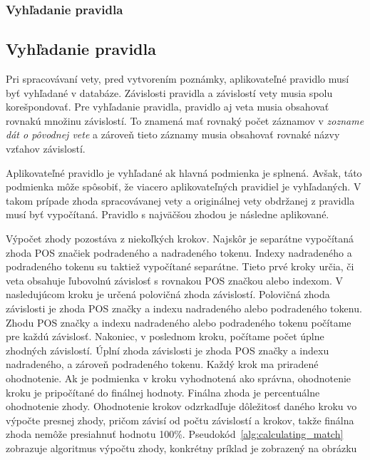 %
%
{
	\subsubsection{Vyhľadanie pravidla}
}
{
	\subsection{Vyhľadanie pravidla}
}

\label{subsubsection:rule_lookup}
Pri spracovávaní vety, pred vytvorením poznámky, aplikovateľné pravidlo musí byť vyhľadané v databáze. Závislosti pravidla a závislostí vety musia spolu korešpondovať. Pre vyhľadanie pravidla, pravidlo aj veta musia obsahovať rovnakú množinu závislostí. To znamená mať rovnaký počet záznamov v \textit{zozname dát o pôvodnej vete} a zároveň tieto záznamy musia obsahovať rovnaké názvy vzťahov závislostí.

Aplikovateľné pravidlo je vyhľadané ak hlavná podmienka je splnená. Avšak, táto podmienka môže spôsobiť, že viacero aplikovateľných pravidiel je vyhľadaných. V takom prípade zhoda spracovávanej vety a originálnej vety obdržanej z pravidla musí byť vypočítaná. Pravidlo s najväčšou zhodou je následne aplikované.

Výpočet zhody pozostáva z niekoľkých krokov. Najskôr je separátne vypočítaná zhoda POS značiek podradeného a nadradeného tokenu. Indexy nadradeného a podradeného tokenu su taktiež vypočítané separátne. Tieto prvé kroky určia, či veta obsahuje ľubovolnú závislosť s rovnakou POS značkou alebo indexom. V nasledujúcom kroku je určená polovičná zhoda závislostí. Polovičná zhoda závislosti je zhoda POS značky a indexu nadradeného alebo podradeného tokenu. Zhodu POS značky a indexu nadradeného alebo podradeného tokenu počítame pre každú závislosť. Nakoniec, v poslednom kroku, počítame počet úplne zhodných závislostí. Úplní zhoda závislosti je zhoda POS značky a indexu nadradeného, a zároveň podradeného tokenu. Každý krok ma priradené ohodnotenie. Ak je podmienka v kroku vyhodnotená ako správna, ohodnotenie kroku je pripočítané do finálnej hodnoty. Finálna zhoda je percentuálne ohodnotenie zhody. Ohodnotenie krokov odzrkadľuje dôležitosť daného kroku vo výpočte presnej zhody, pričom závisí od počtu závislostí a krokov, takže finálna zhoda nemôže presiahnuť hodnotu 100\%. Pseudokód~\ref{alg:calculating_match} zobrazuje algoritmus výpočtu zhody, konkrétny príklad je zobrazený na obrázku~

